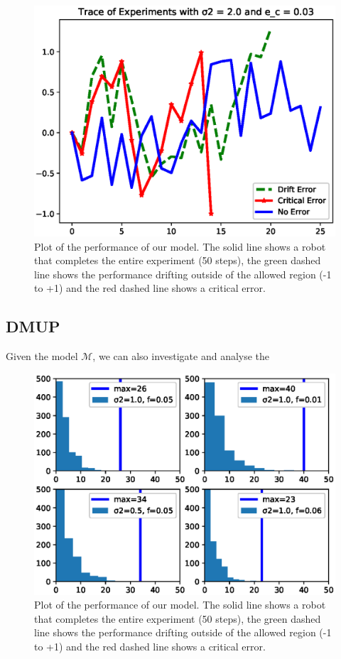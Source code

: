 \documentclass[runningheads]{llncs}
\begin{document}
\begin{figure}
\includegraphics[width=\textwidth]{Figures/plot2.eps}
\caption{Plot of the performance of our model. The solid line shows a robot that completes the entire experiment (50 steps), the green dashed line shows the performance drifting outside of the allowed region (-1 to +1) and the red dashed line shows a critical error.} 
\label{fig:plot}
\end{figure}

\subsection{DMUP}

Given the model $\mathcal{M}$, we can also investigate and analyse the

\begin{figure}
\includegraphics[width=\textwidth]{Figures/hist2.eps}
\caption{Plot of the performance of our model. The solid line shows a robot that completes the entire experiment (50 steps), the green dashed line shows the performance drifting outside of the allowed region (-1 to +1) and the red dashed line shows a critical error.} 
\label{fig:hist}
\end{figure}
\end{document}
